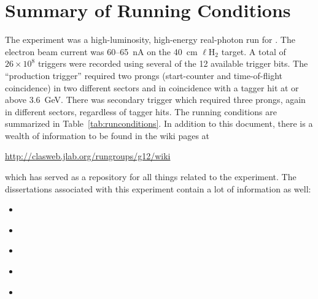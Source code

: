 \section{Summary of Running Conditions}

The  experiment was a high-luminosity, high-energy real-photon run for . The electron beam current was 60--65~nA on the 40~cm $\ell$H$_2$ target. A total of $26\times10^8$ triggers were recorded using several of the 12 available trigger bits. The ``production trigger'' required two prongs (start-counter and time-of-flight coincidence) in two different sectors and in coincidence with a tagger hit at or above 3.6~GeV. There was secondary trigger which required three prongs, again in different sectors, regardless of tagger hits. The running conditions are summarized in Table~\ref{tab:runconditions}. In addition to this document, there is a wealth of information to be found in the wiki pages at
\begin{center}
    \url{http://clasweb.jlab.org/rungroups/g12/wiki}
\end{center}
which has served as a repository for all things related to the  experiment. The dissertations associated with this experiment contain a lot of information as well:

\begin{itemize}
    \item \href{http://www.jlab.org/Hall-B/general/thesis/Goetz_thesis.pdf}{}
    \item \href{http://www.jlab.org/Hall-B/general/thesis/Bookwalter_thesis.pdf}{}
    \item \href{http://www.jlab.org/Hall-B/general/thesis/Schott_thesis.pdf}{}
    \item \href{http://www.jlab.org/Hall-B/general/thesis/MSaini_thesis.pdf}{}
    \item \href{http://www.jlab.org/Hall-B/general/thesis/Bono_thesis.pdf}{}
\end{itemize}




